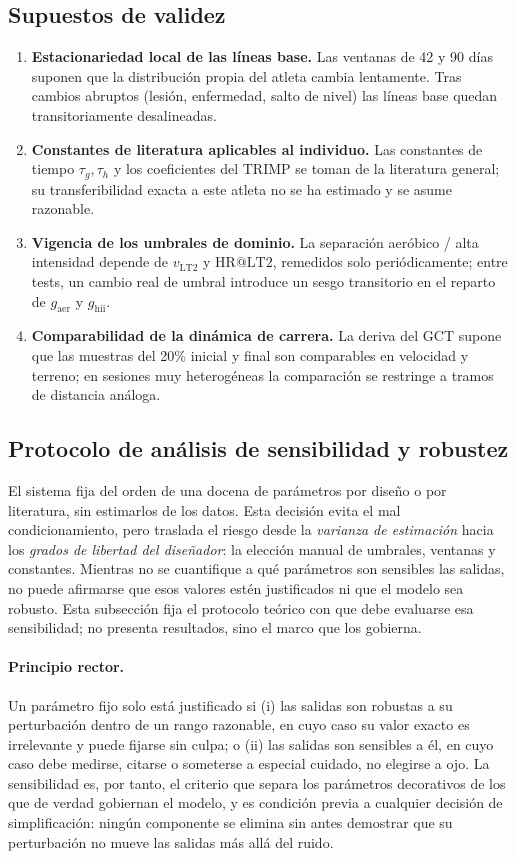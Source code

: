 \documentclass[11pt,a4paper]{article}
\begin{document}
\subsection{Supuestos de validez}
\begin{enumerate}[leftmargin=1.4em,itemsep=2pt]
\item \textbf{Estacionariedad local de las líneas base.} Las ventanas de 42 y 90 días suponen que la distribución propia del atleta cambia lentamente. Tras cambios abruptos (lesión, enfermedad, salto de nivel) las líneas base quedan transitoriamente desalineadas.
\item \textbf{Constantes de literatura aplicables al individuo.} Las constantes de tiempo $\tau_g,\tau_h$ y los coeficientes del TRIMP se toman de la literatura general; su transferibilidad exacta a este atleta no se ha estimado y se asume razonable.
\item \textbf{Vigencia de los umbrales de dominio.} La separación aeróbico / alta intensidad depende de $v_{\mathrm{LT2}}$ y $\mathrm{HR@LT2}$, remedidos solo periódicamente; entre tests, un cambio real de umbral introduce un sesgo transitorio en el reparto de $g_{\mathrm{aer}}$ y $g_{\mathrm{hii}}$.
\item \textbf{Comparabilidad de la dinámica de carrera.} La deriva del GCT supone que las muestras del 20\% inicial y final son comparables en velocidad y terreno; en sesiones muy heterogéneas la comparación se restringe a tramos de distancia análoga.
\end{enumerate}

\subsection{Protocolo de análisis de sensibilidad y robustez}\label{sec:sensibilidad}

El sistema fija del orden de una docena de parámetros por diseño o por literatura, sin estimarlos de los datos. Esta decisión evita el mal condicionamiento, pero traslada el riesgo desde la \emph{varianza de estimación} hacia los \emph{grados de libertad del diseñador}: la elección manual de umbrales, ventanas y constantes. Mientras no se cuantifique a qué parámetros son sensibles las salidas, no puede afirmarse que esos valores estén justificados ni que el modelo sea robusto. Esta subsección fija el protocolo teórico con que debe evaluarse esa sensibilidad; no presenta resultados, sino el marco que los gobierna.

\paragraph{Principio rector.} Un parámetro fijo solo está justificado si (i) las salidas son robustas a su perturbación dentro de un rango razonable, en cuyo caso su valor exacto es irrelevante y puede fijarse sin culpa; o (ii) las salidas son sensibles a él, en cuyo caso debe medirse, citarse o someterse a especial cuidado, no elegirse a ojo. La sensibilidad es, por tanto, el criterio que separa los parámetros decorativos de los que de verdad gobiernan el modelo, y es condición previa a cualquier decisión de simplificación: ningún componente se elimina sin antes demostrar que su perturbación no mueve las salidas más allá del ruido.
\end{document}

